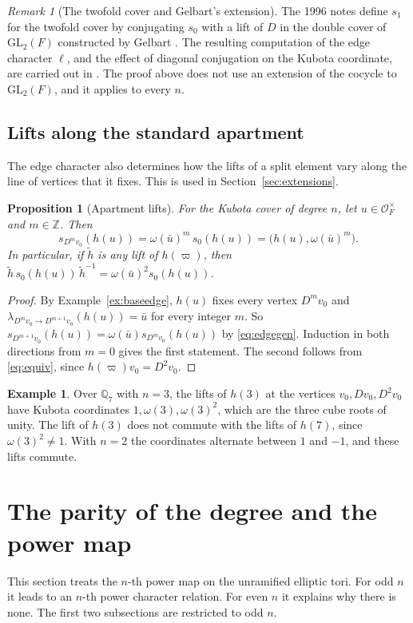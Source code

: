 \documentclass[12pt,letterpaper]{article}
\numberwithin{equation}{section}
\newtheorem{proposition}[theorem]{Proposition}
\theoremstyle{definition}
\newtheorem{example}[theorem]{Example}
\theoremstyle{remark}
\newtheorem{remark}[theorem]{Remark}
\newcommand{\OO}{\mathcal O_F}
\begin{document}
\begin{remark}[The twofold cover and Gelbart's extension]\label{rem:ext}
The 1996 notes define $s_1$ for the twofold cover by conjugating $s_0$ with a lift of $D$ in the double cover of $\mathrm{GL}_2(F)$ constructed by Gelbart \cite{Ge76}. The resulting computation of the edge character $\ell$, and the effect of diagonal conjugation on the Kubota coordinate, are carried out in \cite{Jo26b}. The proof above does not use an extension of the cocycle to $\mathrm{GL}_2(F)$, and it applies to every $n$.
\end{remark}

\subsection*{Lifts along the standard apartment}
The edge character also determines how the lifts of a split element vary along the line of vertices that it fixes. This is used in Section~\ref{sec:extensions}.

\begin{proposition}[Apartment lifts]\label{prop:apartment}
For the Kubota cover of degree $n$, let $u\in\OO^\times$ and $m\in\mathbb Z$. Then
\[
 s_{D^mv_0}(h(u))=\omega(\bar u)^m\,s_0(h(u))=\bigl(h(u),\omega(\bar u)^m\bigr).
\]
In particular, if $\widetilde h$ is any lift of $h(\varpi)$, then $\widetilde h\,s_0(h(u))\,\widetilde h^{-1}=\omega(\bar u)^2s_0(h(u))$.
\end{proposition}
\begin{proof}
By Example~\ref{ex:baseedge}, $h(u)$ fixes every vertex $D^mv_0$ and $\lambda_{D^mv_0\to D^{m+1}v_0}(h(u))=\bar u$ for every integer $m$. So $s_{D^{m+1}v_0}(h(u))=\omega(\bar u)s_{D^mv_0}(h(u))$ by \eqref{eq:edgegen}. Induction in both directions from $m=0$ gives the first statement. The second follows from \eqref{eq:equiv}, since $h(\varpi)v_0=D^2v_0$.
\end{proof}

\begin{example}
Over $\mathbb Q_7$ with $n=3$, the lifts of $h(3)$ at the vertices $v_0,Dv_0,D^2v_0$ have Kubota coordinates $1,\omega(3),\omega(3)^2$, which are the three cube roots of unity. The lift of $h(3)$ does not commute with the lifts of $h(7)$, since $\omega(3)^2\ne1$. With $n=2$ the coordinates alternate between $1$ and $-1$, and these lifts commute.
\end{example}

\section{The parity of the degree and the power map}\label{sec:power}
This section treats the $n$-th power map on the unramified elliptic tori. For odd $n$ it leads to an $n$-th power character relation. For even $n$ it explains why there is none. The first two subsections are restricted to odd $n$.
\end{document}
